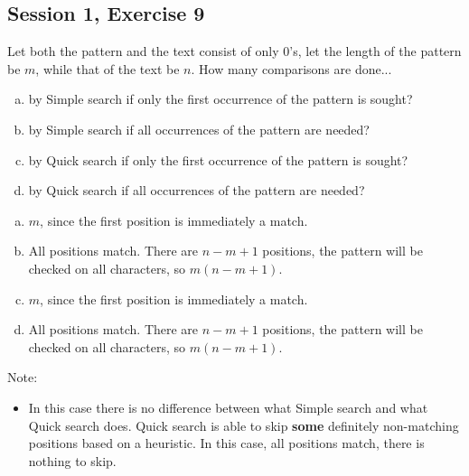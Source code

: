 \subsection{Session 1, Exercise 9}


Let both the pattern and the text consist of only $0$'s, let the length of the pattern be $m$, while that of the text be $n$. How many comparisons are done...

\begin{enumerate}[a.)]
    \item by Simple search if only the first occurrence of the pattern is sought?
    \item by Simple search if all occurrences of the pattern are needed?
    \item by Quick search if only the first occurrence of the pattern is sought?
    \item by Quick search if all occurrences of the pattern are needed?
\end{enumerate}


\begin{enumerate}[a.)]
    \item $m$, since the first position is immediately a match.
    \item All positions match. There are $n-m+1$ positions, the pattern will be checked on all characters, so $m(n-m+1)$.
    \item $m$, since the first position is immediately a match.
    \item All positions match. There are $n-m+1$ positions, the pattern will be checked on all characters, so $m(n-m+1)$.
\end{enumerate}

Note:
\begin{itemize}
    \item In this case there is no difference between what Simple search and what Quick search does. Quick search is able to skip \textbf{some} definitely non-matching positions based on a heuristic. In this case, all positions match, there is nothing to skip.
\end{itemize}
